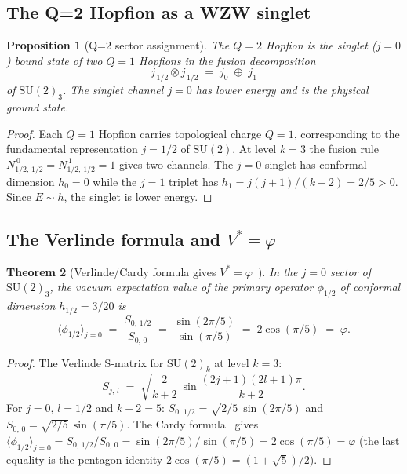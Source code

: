\documentclass[11pt,a4paper]{article}
\newtheorem{theorem}{Theorem}[section]
\newtheorem{proposition}[theorem]{Proposition}
\theoremstyle{definition}
\theoremstyle{remark}
\newcommand{\vp}{\varphi}
\begin{document}
\subsection{The Q=2 Hopfion as a WZW singlet}

\begin{proposition}[Q=2 sector assignment]
\label{P3:prop:q2_sector}
The $Q=2$ Hopfion is the singlet ($j=0$) bound state of two $Q=1$ Hopfions
in the fusion decomposition
\begin{equation}
  j_{\,1/2} \otimes j_{\,1/2} \;=\; j_0 \;\oplus\; j_1
  \label{P3:eq:fusion}
\end{equation}
of $\mathrm{SU}(2)_3$.  The singlet channel $j=0$ has lower energy
and is the physical ground state.
\end{proposition}

\begin{proof}
Each $Q=1$ Hopfion carries topological charge $Q=1$, corresponding to the
fundamental representation $j=1/2$ of $\mathrm{SU}(2)$.  At level $k=3$
the fusion rule $N_{1/2,\,1/2}^{\,0} = N_{1/2,\,1/2}^{\,1} = 1$ gives
two channels.  The $j=0$ singlet has conformal dimension $h_0 = 0$ while
the $j=1$ triplet has $h_1 = j(j+1)/(k+2) = 2/5 > 0$.  Since $E \sim h$,
the singlet is lower energy.
\end{proof}

\subsection{The Verlinde formula and $V^* = \vp$}

\begin{theorem}[Verlinde/Cardy formula gives $V^* = \vp$~\cite{Verlinde1988,Cardy1986}]
\label{P3:thm:verlinde}
In the $j=0$ sector of $\mathrm{SU}(2)_3$, the vacuum expectation value
of the primary operator $\phi_{1/2}$ of conformal dimension $h_{1/2} = 3/20$
is
\begin{equation}
  \langle \phi_{1/2} \rangle_{j=0}
  \;=\; \frac{S_{0,\,1/2}}{S_{0,\,0}}
  \;=\; \frac{\sin(2\pi/5)}{\sin(\pi/5)}
  \;=\; 2\cos(\pi/5)
  \;=\; \vp.
  \label{P3:eq:verlinde_phi}
\end{equation}
\end{theorem}

\begin{proof}
The Verlinde S-matrix for $\mathrm{SU}(2)_k$ at level $k=3$:
\begin{equation}
  S_{j,\,l} \;=\; \sqrt{\frac{2}{k+2}}\,\sin\!\frac{(2j+1)(2l+1)\pi}{k+2}.
\end{equation}
For $j=0$, $l=1/2$ and $k+2=5$:
$S_{0,\,1/2} = \sqrt{2/5}\,\sin(2\pi/5)$ and $S_{0,\,0} = \sqrt{2/5}\,\sin(\pi/5)$.
The Cardy formula~\cite{Cardy1986} gives $\langle\phi_{1/2}\rangle_{j=0} = S_{0,\,1/2}/S_{0,\,0}
= \sin(2\pi/5)/\sin(\pi/5) = 2\cos(\pi/5) = \vp$ (the last equality is the
pentagon identity $2\cos(\pi/5) = (1+\sqrt{5})/2$).
\end{proof}
\end{document}
